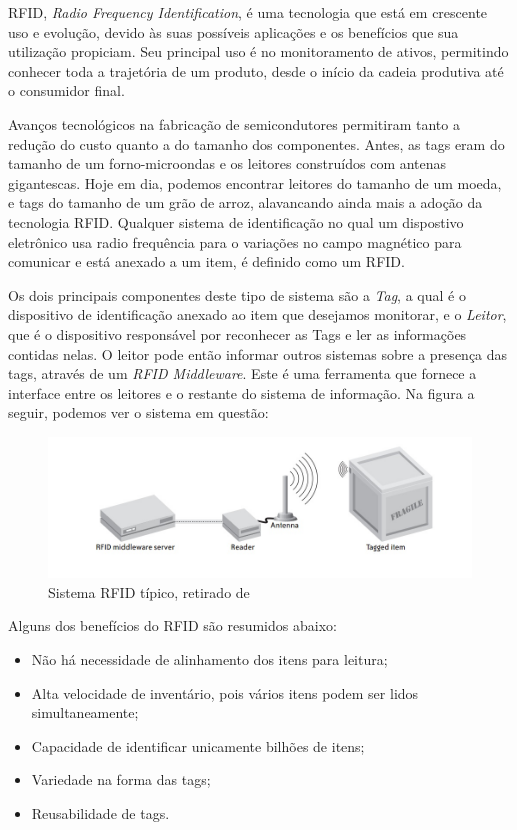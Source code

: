 

%

	
	RFID, \textit{Radio Frequency Identification}, é uma tecnologia que está em crescente uso e evolução, devido às suas possíveis aplicações e os benefícios que sua utilização propiciam. Seu principal uso é no monitoramento de ativos, permitindo conhecer toda a trajetória de um produto, desde o início da cadeia produtiva até o consumidor final. 
	
	Avanços tecnológicos na fabricação de semicondutores permitiram tanto a redução do custo quanto a do tamanho dos componentes. Antes, as tags eram do tamanho de um forno-microondas e os leitores construídos com antenas gigantescas. Hoje em dia, podemos encontrar leitores do tamanho de um moeda, e tags do tamanho de um grão de arroz, alavancando ainda mais a adoção da tecnologia RFID. Qualquer sistema de identificação no qual um dispostivo eletrônico usa radio frequência para o variações no campo magnético para comunicar e está anexado a um item, é definido como um RFID.
	
	Os dois principais componentes deste tipo de sistema são a \textit{Tag}, a qual é o dispositivo de identificação anexado ao item que desejamos monitorar, e o \textit{Leitor}, que é o dispositivo responsável por reconhecer as Tags e ler as informações contidas nelas. O leitor pode então informar outros sistemas sobre a presença das tags, através de um \textit{RFID Middleware}. Este é uma ferramenta que fornece a interface entre os leitores e o restante do sistema de informação. Na figura a seguir, podemos ver o sistema em questão:
	
	\begin{figure}[h!]
		\centering
		\includegraphics[width=0.6\linewidth]{rfidsys2}
		\caption{Sistema RFID típico, retirado de \cite{rfidbook}}
		\label{fig:rfidsys}
	\end{figure}
	
	Alguns dos benefícios do RFID são resumidos abaixo:
	\begin{itemize}
		\item Não há necessidade de alinhamento dos itens para leitura;
		\item Alta velocidade de inventário, pois vários itens podem ser lidos simultaneamente;
		\item Capacidade de identificar unicamente bilhões de itens;
		\item Variedade na forma das tags;
		\item Reusabilidade de tags.
	\end{itemize}
	

